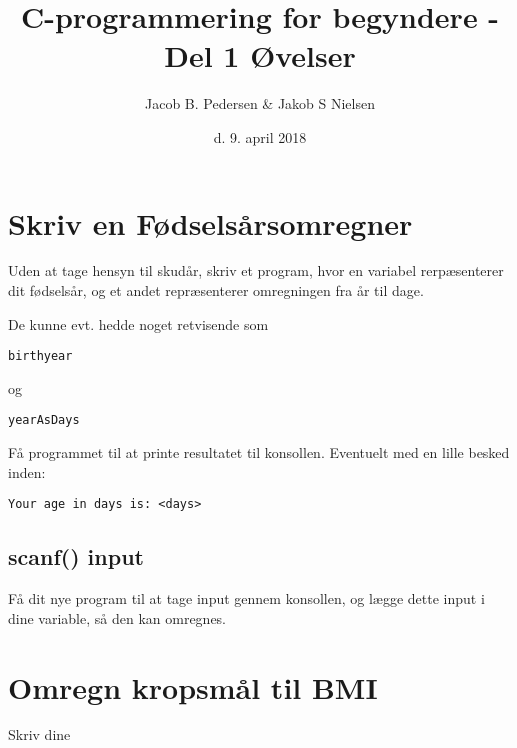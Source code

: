 \documentclass[hidelinks]{article} %
\title{C-programmering for begyndere - Del 1
 		\break
 		\break
		\large Øvelser} %
\date{d. 9. april 2018} %
\author{Jacob B. Pedersen \break \& \break Jakob S Nielsen} %
\begin{document}

	\section{Skriv en Fødselsårsomregner}
Uden at tage hensyn til skudår, skriv et program, hvor en variabel rerpæsenterer dit fødselsår, og et andet repræsenterer omregningen fra år til dage.

De kunne evt. hedde noget retvisende som 
\begin{verbatim}birthyear
\end{verbatim}
og
\begin{verbatim}yearAsDays
\end{verbatim}

Få programmet til at printe resultatet til konsollen. Eventuelt med en lille besked inden:

\begin{verbatim}Your age in days is: <days>
\end{verbatim}

	\subsection{scanf() input}
Få dit nye program til at tage input gennem konsollen, og lægge dette input i dine variable, så den kan omregnes.

	\section{Omregn kropsmål til BMI}
Skriv dine 
\end{document}
